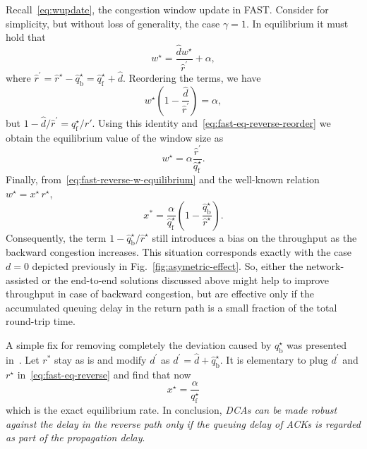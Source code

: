 \documentclass[english,times]{ettauth}
\begin{document}
Recall~\eqref{eq:wupdate}, the congestion window update in FAST.  Consider for
simplicity, but without loss of generality, the case $\gamma = 1$. In
equilibrium it must hold that
\begin{equation}
  \label{eq:fast-eq-reverse}
  w^\star = \frac{\hat d w^\star}{\hat r^\prime} + \alpha,
\end{equation}
where $\hat r^\prime = \hat r^\star - \hat q^\star_{\mathrm{b}} = \hat
q^\star_{\mathrm f} + \hat d$. Reordering the terms, we have
\begin{equation}
  \label{eq:fast-eq-reverse-reorder}
  w^\star \left(1 - \frac{\hat d}{\hat r^\prime}\right) = \alpha,
\end{equation}
but $1 - \hat d / \hat r^\prime = q^\star_{\mathrm f}/\hat r'$. Using this
identity and~\eqref{eq:fast-eq-reverse-reorder} we obtain the equilibrium
value of the window size as
\begin{equation}
  \label{eq:fast-reverse-w-equilibrium}
  w^\star = \alpha \frac{\hat r^\prime}{\hat q_{\mathrm f}^\star}.
\end{equation}
Finally, from~\eqref{eq:fast-reverse-w-equilibrium} and the well-known
relation $w^\star = x^\star\, r^\star$,
\begin{equation}
  \label{eq:fast-reverse-x-funcof-qf}
  x^* = \frac{\alpha}{\hat q_{\mathrm f}^\star} \left(1 - \frac{\hat q_{\mathrm
        b}^\star}{\hat r^\star}\right).
\end{equation}
Consequently, the term $1 - \hat q_{\mathrm b}^\star / \hat r^\star$ still
introduces a bias on the throughput as the backward congestion increases. This
situation corresponds exactly with the case $d = 0$ depicted previously in
Fig.~\ref{fig:asymetric-effect}. So, either the network-assisted or the
end-to-end solutions discussed above might help to improve throughput in case
of backward congestion, but are effective only if the accumulated queuing
delay in the return path is a small fraction of the total round-trip time.

A simple fix for removing completely the deviation caused by
$q^\star_\mathrm{b}$ was presented in~\cite{Herreria07}. Let $r^*$ stay as is
and modify $d^\prime$ as $d^\prime = \hat d + \hat q^\star_{\mathrm{b}}$. It
is elementary to plug $d^\prime$ and $r^\star$ in~\eqref{eq:fast-eq-reverse}
and find that now
\begin{equation}
  \label{eq:fast-reverse-final-throughput}
  x^\star = \frac{\alpha}{q^\star_{\mathrm f}}
\end{equation}
which is the exact equilibrium rate. In conclusion, \emph{DCAs can be made
  robust against the delay in the reverse path only if the queuing delay of
  ACKs is regarded as part of the propagation delay}.
\end{document}
